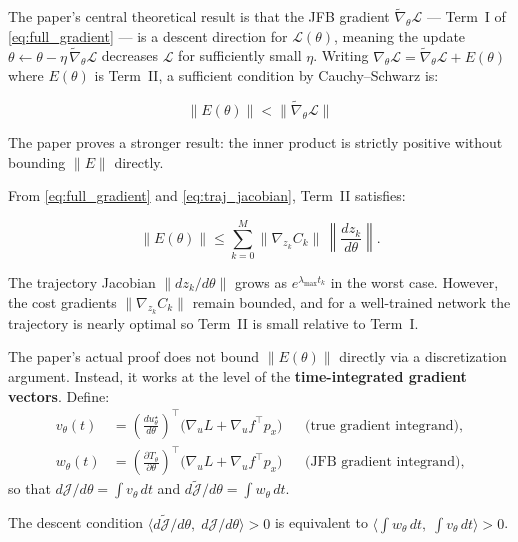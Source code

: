 \documentclass{article}
\begin{document}
\begin{mathrequirementsbox}
\label{thm:jfb-descent}
The paper's central theoretical result is that the JFB gradient
$\widetilde{\nabla}_\theta\mathcal{L}$ --- Term~I of
\eqref{eq:full_gradient} --- is a descent direction for
$\mathcal{L}(\theta)$, meaning the update
$\theta \leftarrow \theta - \eta\,\widetilde{\nabla}_\theta\mathcal{L}$
decreases $\mathcal{L}$ for sufficiently small $\eta$. Writing
$\nabla_\theta\mathcal{L} = \widetilde{\nabla}_\theta\mathcal{L} + E(\theta)$
where $E(\theta)$ is Term~II, a sufficient condition by Cauchy--Schwarz is:

\begin{equation}
    \|E(\theta)\| < \|\widetilde{\nabla}_\theta\mathcal{L}\|
    \label{eq:norm_condition}
\end{equation}

The paper proves a stronger result: the inner product is strictly positive
without bounding $\|E\|$ directly.

From \eqref{eq:full_gradient} and \eqref{eq:traj_jacobian}, Term~II satisfies:

\begin{equation}
    \|E(\theta)\|
    \leq \sum_{k=0}^{M}
    \|\nabla_{z_k} C_k\|\,
    \left\|\frac{dz_k}{d\theta}\right\|.
\end{equation}

The trajectory Jacobian $\|dz_k/d\theta\|$ grows as $e^{\lambda_{\max}t_k}$
in the worst case. However, the cost gradients $\|\nabla_{z_k} C_k\|$ remain
bounded, and for a well-trained network the trajectory is nearly optimal so
Term~II is small relative to Term~I.

The paper's actual proof does not bound $\|E(\theta)\|$ directly via a
discretization argument. Instead, it works at the level of the
\textbf{time-integrated gradient vectors}. Define:
\begin{align}
    v_\theta(t) &= \left(\frac{du^\star_\theta}{d\theta}\right)^{\!\top}
    \bigl(\nabla_u L + \nabla_u f^\top p_x\bigr)
    &&\text{(true gradient integrand)}, \\
    w_\theta(t) &= \left(\frac{\partial T_\theta}{\partial\theta}\right)^{\!\top}
    \bigl(\nabla_u L + \nabla_u f^\top p_x\bigr)
    &&\text{(JFB gradient integrand)},
\end{align}
so that $d\mathcal{J}/d\theta = \int v_\theta\, dt$ and
$d\widetilde{\mathcal{J}}/d\theta = \int w_\theta\, dt$.

The descent condition
$\langle d\widetilde{\mathcal{J}}/d\theta,\; d\mathcal{J}/d\theta\rangle > 0$
is equivalent to
$\bigl\langle \int w_\theta\, dt,\; \int v_\theta\, dt \bigr\rangle > 0$.


\end{mathrequirementsbox}
\end{document}
